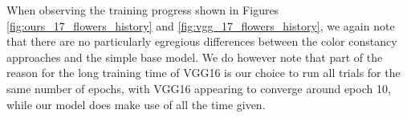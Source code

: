\def\historygraphheight{5cm}

When observing the training progress shown in Figures \ref{fig:ours_17_flowers_history} and \ref{fig:vgg_17_flowers_history}, we again note that there are no particularly
egregious differences between the color constancy approaches and the simple base model. We do however note that part of the reason for the long training time of VGG16
is our choice to run all trials for the same number of epochs, with VGG16 appearing to converge around epoch 10, while our model does make use of all the time given.

\ourssmalltrainacc
{}\ourssmallvalacc

